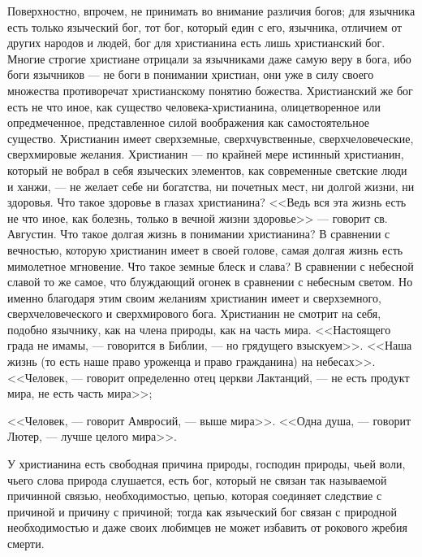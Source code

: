 \documentclass[12pt]{article}
\begin{document}
Поверхностно, впрочем, не принимать во внимание различия богов; для язычника есть только языческий бог, тот бог, который един с его, язычника, отличием от других народов и людей, бог для христианина есть лишь христианский бог. Многие строгие христиане отрицали за язычниками даже самую веру в бога, ибо боги язычников --- не боги в понимании христиан, они уже в силу своего множества противоречат христианскому понятию божества. Христианский же бог есть не что иное, как существо человека-христианина, олицетворенное или опредмеченное, представленное силой воображения как самостоятельное существо. Христианин имеет сверхземные, сверхчувственные, сверхчеловеческие, сверхмировые желания. Христианин --- по крайней мере истинный христианин, который не вобрал в себя языческих элементов, как современные светские люди и ханжи, --- не желает себе ни богатства, ни почетных мест, ни долгой жизни, ни здоровья. Что такое здоровье в глазах христианина? <<Ведь вся эта жизнь есть не что иное, как болезнь, только в вечной жизни здоровье>>  --- говорит св. Августин. Что такое долгая жизнь в понимании христианина? В сравнении с вечностью, которую христианин имеет в своей голове, самая долгая жизнь есть мимолетное мгновение. Что такое земные блеск и слава? В сравнении с небесной славой то же самое, что блуждающий огонек в сравнении с небесным светом. Но именно благодаря этим своим желаниям христианин имеет и сверхземного, сверхчеловеческого и сверхмирового бога. Христианин не смотрит на себя, подобно язычнику, как на члена природы, как на часть мира. <<Настоящего града не имамы, --- говорится в Библии, --- но грядущего взыскуем>>. <<Наша жизнь (то есть наше право уроженца и право гражданина) на небесах>>. <<Человек, --- говорит определенно отец церкви Лактанций, --- не есть продукт мира, не есть часть мира>>; 

<<Человек, --- говорит Амвросий, --- выше мира>>. <<Одна душа, --- говорит Лютер, --- лучше целого мира>>. 

У христианина есть свободная причина природы, господин природы, чьей воли, чьего слова природа слушается, есть бог, который не связан так называемой причинной связью, необходимостью, цепью, которая соединяет следствие с причиной и причину с причиной; тогда как языческий бог связан с природной необходимостью и даже своих любимцев не может избавить от рокового жребия смерти. 
\end{document}

